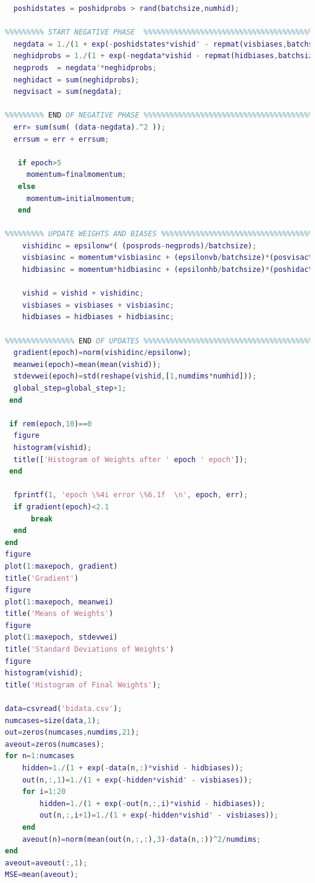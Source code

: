 \documentclass{article}
\begin{document}
\begin{lstlisting}[language=Matlab]
%%%%%%%%% END OF POSITIVE PHASE  %%%%%%%%%%%%%%%%%%%%%%%%%%%%%%%%%%%%%%%%%%%%%%%%%
  poshidstates = poshidprobs > rand(batchsize,numhid);

%%%%%%%%% START NEGATIVE PHASE  %%%%%%%%%%%%%%%%%%%%%%%%%%%%%%%%%%%%%%%%%%%%%%%%%%
  negdata = 1./(1 + exp(-poshidstates*vishid' - repmat(visbiases,batchsize,1)));
  neghidprobs = 1./(1 + exp(-negdata*vishid - repmat(hidbiases,batchsize,1)));
  negprods  = negdata'*neghidprobs;
  neghidact = sum(neghidprobs);
  negvisact = sum(negdata);

%%%%%%%%% END OF NEGATIVE PHASE %%%%%%%%%%%%%%%%%%%%%%%%%%%%%%%%%%%%%%%%%%%%%%%%%%
  err= sum(sum( (data-negdata).^2 ));
  errsum = err + errsum;

   if epoch>5
     momentum=finalmomentum;
   else
     momentum=initialmomentum;
   end

%%%%%%%%% UPDATE WEIGHTS AND BIASES %%%%%%%%%%%%%%%%%%%%%%%%%%%%%%%%%%%%%%%%%%%%%%%
    vishidinc = epsilonw*( (posprods-negprods)/batchsize);
    visbiasinc = momentum*visbiasinc + (epsilonvb/batchsize)*(posvisact-negvisact);
    hidbiasinc = momentum*hidbiasinc + (epsilonhb/batchsize)*(poshidact-neghidact);

    vishid = vishid + vishidinc;
    visbiases = visbiases + visbiasinc;
    hidbiases = hidbiases + hidbiasinc;

%%%%%%%%%%%%%%%% END OF UPDATES %%%%%%%%%%%%%%%%%%%%%%%%%%%%%%%%%%%%%%%%%%%%%%%%%%%%
  gradient(epoch)=norm(vishidinc/epsilonw);
  meanwei(epoch)=mean(mean(vishid));
  stdevwei(epoch)=std(reshape(vishid,[1,numdims*numhid]));
  global_step=global_step+1;
 end

 if rem(epoch,10)==0
  figure
  histogram(vishid);
  title(['Histogram of Weights after ' epoch ' epoch']);
 end

  fprintf(1, 'epoch \%4i error \%6.1f  \n', epoch, err);
  if gradient(epoch)<2.1
      break
  end
end
figure
plot(1:maxepoch, gradient)
title('Gradient')
figure
plot(1:maxepoch, meanwei)
title('Means of Weights')
figure
plot(1:maxepoch, stdevwei)
title('Standard Deviations of Weights')
figure
histogram(vishid);
title('Histogram of Final Weights');

data=csvread('bidata.csv');
numcases=size(data,1);
out=zeros(numcases,numdims,21);
aveout=zeros(numcases);
for n=1:numcases
    hidden=1./(1 + exp(-data(n,:)*vishid - hidbiases));
    out(n,:,1)=1./(1 + exp(-hidden*vishid' - visbiases));
    for i=1:20
        hidden=1./(1 + exp(-out(n,:,i)*vishid - hidbiases));
        out(n,:,i+1)=1./(1 + exp(-hidden*vishid' - visbiases));
    end
    aveout(n)=norm(mean(out(n,:,:),3)-data(n,:))^2/numdims;
end
aveout=aveout(:,1);
MSE=mean(aveout);
\end{lstlisting}
\end{document}
